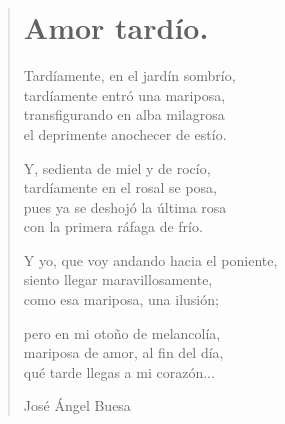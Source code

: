 \documentclass[11pt, portrait, twoside, notitlepage, openright]{book}
\begin{document}
\newpage
\begin{verse}
\begin{center}
\section{Amor tardío.}
\end{center}
Tardíamente, en el jardín sombrío,\\
tardíamente entró una mariposa,\\
transfigurando en alba milagrosa\\
el deprimente anochecer de estío.
\newline

Y, sedienta de miel y de rocío,\\
tardíamente en el rosal se posa,\\
pues ya se deshojó la última rosa\\
con la primera ráfaga de frío.
\newline

Y yo, que voy andando hacia el poniente,\\
siento llegar maravillosamente,\\
como esa mariposa, una ilusión;
\newline

pero en mi otoño de melancolía,\\
mariposa de amor, al fin del día,\\
qué tarde llegas a mi corazón...
\newline

José Ángel Buesa
\end{verse}
\end{document}
